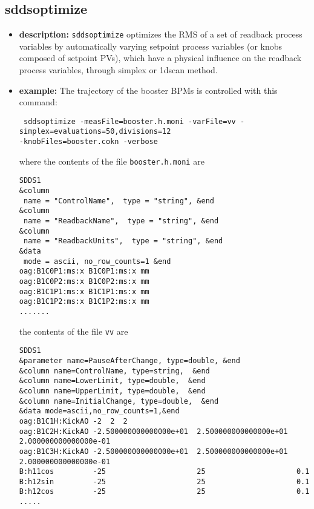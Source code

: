 %
%
\begin{latexonly}
\newpage
\end{latexonly}

%
%
\subsection{sddsoptimize}
\label{sddsoptimize}

\begin{itemize}
\item {\bf description:}
%
%
\verb+sddsoptimize+ optimizes the RMS of a set of readback process variables by automatically varying setpoint process variables (or knobs composed of setpoint PVs), which have a physical influence on the readback process variables, through simplex or 1dscan method.   

\item {\bf example:} 
%
% 
%
The trajectory of the booster BPMs is controlled with this command:
\begin{flushleft}{\tt
sddsoptimize -measFile=booster.h.moni -varFile=vv -simplex=evaluations=50,divisions=12\\
\quad -knobFiles=booster.cokn -verbose
}\end{flushleft}
where the contents of the file \verb+booster.h.moni+ are
\begin{verbatim}
SDDS1
&column
 name = "ControlName",  type = "string", &end
&column
 name = "ReadbackName",  type = "string", &end
&column             
 name = "ReadbackUnits",  type = "string", &end
&data
 mode = ascii, no_row_counts=1 &end
oag:B1C0P1:ms:x B1C0P1:ms:x mm
oag:B1C0P2:ms:x B1C0P2:ms:x mm
oag:B1C1P1:ms:x B1C1P1:ms:x mm
oag:B1C1P2:ms:x B1C1P2:ms:x mm
.......

\end{verbatim}
the contents of the file \verb+vv+ are
\begin{verbatim}
SDDS1
&parameter name=PauseAfterChange, type=double, &end
&column name=ControlName, type=string,  &end
&column name=LowerLimit, type=double,  &end
&column name=UpperLimit, type=double,  &end
&column name=InitialChange, type=double,  &end
&data mode=ascii,no_row_counts=1,&end
oag:B1C1H:KickAO -2  2  2 
oag:B1C2H:KickAO -2.500000000000000e+01  2.500000000000000e+01  2.000000000000000e-01 
oag:B1C3H:KickAO -2.500000000000000e+01  2.500000000000000e+01  2.000000000000000e-01 
B:h11cos         -25                     25                     0.1
B:h12sin         -25                     25                     0.1
B:h12cos         -25                     25                     0.1
.....


\end{verbatim}
\end{itemize}
